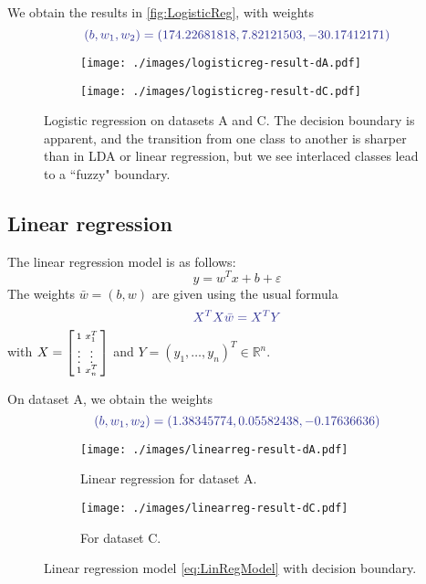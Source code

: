 \documentclass[11pt]{article}
\newcommand\RR{\mathbb{R}}
\renewcommand{\epsilon}{\varepsilon}
\begin{document}
We obtain the results in \autoref{fig:LogisticReg}, with weights
\[
{\color{Blue}
	(b, w_1, w_2) = (174.22681818, 7.82121503, -30.17412171)
}
\]


\begin{figure}
	\begin{subfigure}{0.49\linewidth}
	\centering
	\texttt{[image: ./images/logisticreg-result-dA.pdf]}
	\end{subfigure}
	\begin{subfigure}{0.49\linewidth}
	\centering
	\texttt{[image: ./images/logisticreg-result-dC.pdf]}
	\end{subfigure}
	\caption{Logistic regression on datasets A and C. The decision boundary is apparent, and the transition from one class to another is sharper than in LDA or linear regression, but we see interlaced classes lead to a ``fuzzy" boundary.}\label{fig:LogisticReg}
\end{figure}


\subsection{Linear regression}

The linear regression model is as follows:
\begin{equation}\label{eq:LinRegModel}
	y = w^Tx + b + \epsilon
\end{equation}
The weights $\bar{w}=(b, w)$ are given using the usual formula
\begin{equation}
{\color{Blue}
	X^TX\bar{w} = X^TY
}
\end{equation}
with $X = \begin{bsmallmatrix}1& x_1^T\\ \vdots&\vdots\\ 1&x_n^T\end{bsmallmatrix}$ and $Y = (y_1,\ldots,y_n)^T \in \RR^n$.

On dataset A, we obtain the weights
\[
\color{Blue}
(b, w_1, w_2)
= (1.38345774,  0.05582438, -0.17636636)
\]

\begin{figure}
	\begin{subfigure}{0.49\linewidth}
	\centering
	\texttt{[image: ./images/linearreg-result-dA.pdf]}
	\caption{Linear regression for dataset A.}
	\end{subfigure}
	\begin{subfigure}{0.49\linewidth}
	\centering
	\texttt{[image: ./images/linearreg-result-dC.pdf]}\caption{For dataset C.}
	\end{subfigure}
	\caption{Linear regression model \eqref{eq:LinRegModel} with decision boundary.}
\end{figure}
\end{document}

